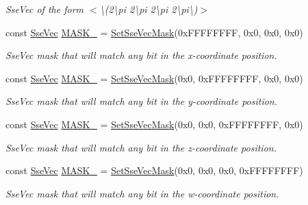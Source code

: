 \begin{DoxyCompactItemize}
\begin{DoxyCompactList}\small\item\em Sse\+Vec of the form $<$\textbackslash{}(2\textbackslash{}pi 2\textbackslash{}pi 2\textbackslash{}pi 2\textbackslash{}pi\textbackslash{})$>$ \end{DoxyCompactList}\item 
const \hyperlink{namespacegofxmath_a634570ddcd2496053ee966227080e02f}{Sse\+Vec} \hyperlink{namespacegofxmath_a47a55dbc42a84afc2fc369f8d87605d1}{M\+A\+S\+K\+\_} = \hyperlink{namespacegofxmath_a00fde6f7347c3610a9b6184079d6490e}{Set\+Sse\+Vec\+Mask}(0x\+F\+F\+F\+F\+F\+F\+F\+F, 0x0, 0x0, 0x0)
\begin{DoxyCompactList}\small\item\em Sse\+Vec mask that will match any bit in the x-\/coordinate position. \end{DoxyCompactList}\item 
const \hyperlink{namespacegofxmath_a634570ddcd2496053ee966227080e02f}{Sse\+Vec} \hyperlink{namespacegofxmath_a8cdc76e209aa891f09b886c3f00fa7ba}{M\+A\+S\+K\+\_} = \hyperlink{namespacegofxmath_a00fde6f7347c3610a9b6184079d6490e}{Set\+Sse\+Vec\+Mask}(0x0, 0x\+F\+F\+F\+F\+F\+F\+F\+F, 0x0, 0x0)
\begin{DoxyCompactList}\small\item\em Sse\+Vec mask that will match any bit in the y-\/coordinate position. \end{DoxyCompactList}\item 
const \hyperlink{namespacegofxmath_a634570ddcd2496053ee966227080e02f}{Sse\+Vec} \hyperlink{namespacegofxmath_ad431727ef9389a0240a56b9fa2f99a14}{M\+A\+S\+K\+\_} = \hyperlink{namespacegofxmath_a00fde6f7347c3610a9b6184079d6490e}{Set\+Sse\+Vec\+Mask}(0x0, 0x0, 0x\+F\+F\+F\+F\+F\+F\+F\+F, 0x0)
\begin{DoxyCompactList}\small\item\em Sse\+Vec mask that will match any bit in the z-\/coordinate position. \end{DoxyCompactList}\item 
const \hyperlink{namespacegofxmath_a634570ddcd2496053ee966227080e02f}{Sse\+Vec} \hyperlink{namespacegofxmath_afec549b0968ef5d9ea00d1eb2deda70b}{M\+A\+S\+K\+\_} = \hyperlink{namespacegofxmath_a00fde6f7347c3610a9b6184079d6490e}{Set\+Sse\+Vec\+Mask}(0x0, 0x0, 0x0, 0x\+F\+F\+F\+F\+F\+F\+F\+F)
\begin{DoxyCompactList}\small\item\em Sse\+Vec mask that will match any bit in the w-\/coordinate position. \end{DoxyCompactList}\item 

\end{DoxyCompactItemize}
